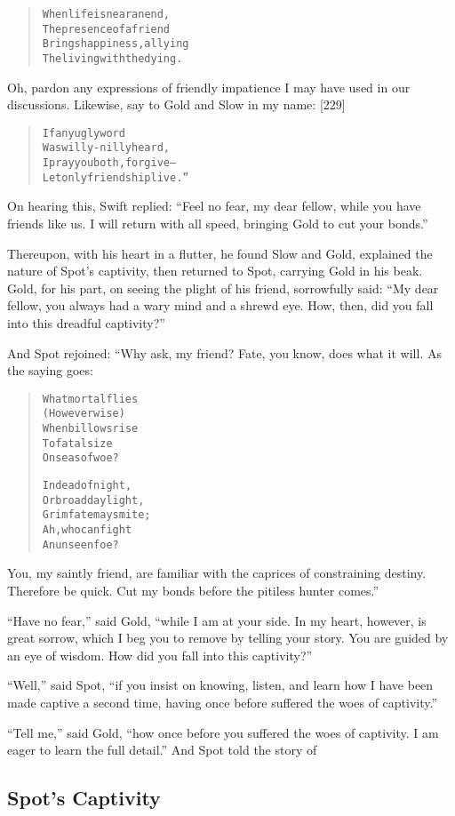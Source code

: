 \documentclass[article, twoside, 14pt]{memoir}
\renewenvironment{verbatim}{%
\begin{quote}%
\vskip -10pt%
\begin{alltt}\normalfont\large}{\end{alltt}%
\end{quote}%
\vskip -10pt
} %
\begin{document}
\begin{verbatim}
When life is near an end,
The presence of a friend
Brings happiness, allying
The living with the dying.
\end{verbatim}
Oh, pardon any expressions of friendly impatience I may have used
in our discussions. Likewise, say to Gold and Slow in my name:
[229]

\begin{verbatim}
If any ugly word
Was willy-nilly heard,
I pray you both, forgive--
Let only friendship live.”
\end{verbatim}
On hearing this, Swift replied:
``Feel no fear, my dear fellow, while you have friends like us. I will return with all speed, bringing Gold to cut your bonds.''

Thereupon, with his heart in a flutter, he found Slow and Gold,
explained the nature of Spot's captivity, then returned to Spot,
carrying Gold in his beak. Gold, for his part, on seeing the plight
of his friend, sorrowfully said:
``My dear fellow, you always had a wary mind and a shrewd eye. How, then, did you fall into this dreadful captivity?''

And Spot rejoined: “Why ask, my friend? Fate, you know, does what
it will. As the saying goes:

\begin{verbatim}
What mortal flies
(However wise)
When billows rise
To fatal size
    On seas of woe?

In dead of night,
Or broad daylight,
Grim fate may smite;
Ah, who can fight
    An unseen foe?
\end{verbatim}
You, my saintly friend, are familiar with the caprices of
constraining destiny. Therefore be quick. Cut my bonds before the
pitiless hunter comes.”

``Have no fear,'' said Gold,
``while I am at your side. In my heart, however, is great sorrow, which I beg you to remove by telling your story. You are guided by an eye of wisdom. How did you fall into this captivity?''

``Well,'' said Spot,
``if you insist on knowing, listen, and learn how I have been made captive a second time, having once before suffered the woes of captivity.''

``Tell me,'' said Gold,
``how once before you suffered the woes of captivity. I am eager to learn the full detail.''
And Spot told the story of

\subsection{Spot's Captivity}
\end{document}
